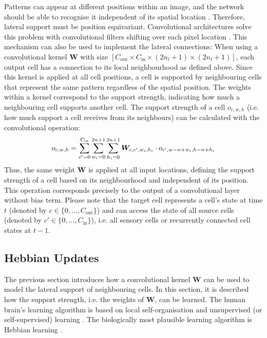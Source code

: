 Patterns can appear at different positions within an image, and the network should be able to recognise it independent of its spatial location . 
Therefore, lateral support must be position equivariant.
Convolutional architectures solve this problem with convolutional filters shifting over each pixel location . This mechanism can also be used to implement the lateral connections: When using a convolutional kernel $\boldsymbol{W}$ with size $\left[C_{\text{out}} \times C_{\text{in}} \times (2n_l+1) \times (2n_l+1) \right]$, each output cell has a connection to its local neighbourhood as defined above.
Since this kernel is applied at all cell positions, a cell is supported by neighbouring cells that represent the same pattern regardless of the spatial position.
The weights within a kernel correspond to the support strength, indicating how much a neighbouring cell supports another cell. The support strength of a cell $o_{c,w,h}$ (i.e. how much support a cell receives from its neighbours) can be calculated with the convolutional operation: 
%
\begin{align}\eqlbl{convlat_1}
	o_{c,w,h} = \sum_{c'=0}^{C_{\text{in}}} \sum_{w_i=0}^{2n+1} \sum_{h_i=0}^{2n+1} \boldsymbol{W}_{c, c',w_i,h_i} \cdot o_{c',w-n+w_i,h-n+h_i}
\end{align}
%
Thus, the same weight $\boldsymbol{W}$ is applied at all input locations, defining the support strength of a cell based on its neighbourhood and independent of its position.
This operation corresponds precisely to the output of a convolutional layer without bias term.
Please note that the target cell represents a cell's state at time $t$ (denoted by $c \in \{0, ..., C_{\text{out}}\}$) and can access the state of all source cells (denoted by $c' \in \{0, ..., C_{\text{in}}\}$), i.e. all sensory cells or recurrently connected cell states at $t-1$.

\subsection{Hebbian Updates}
The previous section introduces how a convolutional kernel $\boldsymbol{W}$ can be used to model the lateral support of neighbouring cells.
In this section, it is described how the support strength, i.e. the weights of $\boldsymbol{W}$, can be learned.
The human brain's learning algorithm is based on local self-organisation and unsupervised (or self-supervised) learning . The biologically most plausible learning algorithm is Hebbian learning .

